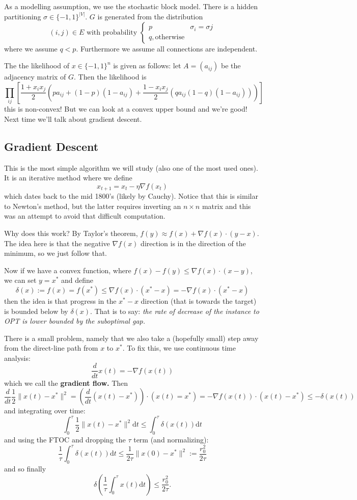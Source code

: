 \documentclass[12pt]{article}
\begin{document}
As a modelling assumption, we use the stochastic block model. There is a hidden partitioning $\sigma\in \{-1,1\}^|V|.$ $G$ is generated from the distribution
\[(i,j)\in E\text{ with probability }\left\{\begin{array}{lr}p & \sigma_i=\sigma j\\ q, \text{otherwise}\end{array}\right. \]
where we assume $q<p$. Furthermore we assume all connections are independent.

The the likelihood of $x\in\{-1,1\}^n$ is given as follows: let $A=(a_{ij})$ be the adjacency matrix of $G$. Then the likelihood is 
\[\prod_{ij}\left[\frac{1+x_ix_j}{2}\left(pa_{ij}+(1-p)(1-a_{ij})+\frac{1-x_ix_j}{2}(qa_{ij}(1-q)(1-a_{ij}))\right)\right]\]
this is non-convex! But we can look at a convex upper bound and we're good! Next time we'll talk about gradient descent.

\subsection{Gradient Descent}
This is the most simple algorithm we will study (also one of the most used ones). It is an iterative method where we define 
\[x_{t+1}=x_t-\eta\nabla f(x_t)\]
which dates back to the mid 1800's (likely by Cauchy). Notice that this is similar to Newton's method, but the latter requires inverting an $n\times n$ matrix 
and this was an attempt to avoid that difficult computation.

Why does this work? By Taylor's theorem, $f(y)\approx f(x)+\nabla f(x)\cdot (y-x)$. The idea here is that the negative $\nabla f(x)$ direction is in the direction of the minimum, so we just follow that.

Now if we have a convex function, where $f(x)-f(y)\le\nabla f(x)\cdot (x-y)$, we can set $y=x^\ast$ and define 
\[\delta(x):=f(x)=f(x^\ast)\le\nabla f(x)\cdot (x^\ast-x)=-\nabla f(x)\cdot(x^\ast-x)\]
then the idea is that progress in the $x^\ast-x$ direction (that is towards the target) is bounded below by $\delta(x)$.
That is to say: \textit{the rate of decrease of the instance to OPT is lower bounded by the suboptimal gap.}

There is a small problem, namely that we also take a (hopefully small) step away from the direct-line path from $x$ to $x^\ast$. To fix this, we
use continuous time analysis:
\[\frac{d}{dt}x(t)=-\nabla f(x(t))\]
which we call the \textbf{gradient flow.} Then 
\[\frac{d}{dt}\frac{1}{2}\|x(t)-x^\ast\|^2=\left(\frac{d}{dt}(x(t)-x^\ast)\right)\cdot(x(t)=x^\ast)=-\nabla f(x(t))\cdot (x(t)-x^\ast)\le -\delta(x(t))\]
and integrating over time:
\[\int_0^\tau \frac{1}{2}\|x(t)-x^\ast\|^2 \mathrm{d}t\le\int_0^\tau \delta(x(t))\mathrm{d}t\]
and using the FTOC and dropping the $\tau$ term (and normalizing):
\[\frac{1}{\tau}\int_0^\tau\delta(x(t))\mathrm dt\le \frac{1}{2\tau}\|x(0)-x^\ast\|^2:=\frac{r_0^2}{2\tau}\]
and so finally
\[\delta\left(\frac{1}{\tau}\int_0^\tau x(t) \mathrm{d}t\right)\le\frac{r_0^2}{2\tau}.\]
\end{document}
